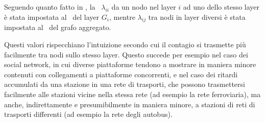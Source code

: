Seguendo quanto fatto in \cite{basaras:infspmul}, la \epprob\ $\lambda_{ii}$ da un nodo nel 
layer $i$ ad uno dello stesso layer è stata impostata al \crepp\ del layer $G_i$, 
mentre $\lambda_{ij}$ tra nodi in layer diversi è stata impostata al \crepp\ del grafo 
aggregato. 

Questi valori rispecchiano l'intuizione secondo cui il contagio si trasmette 
più facilmente tra nodi sullo stesso layer. Questo succede per esempio nel caso dei social 
network, in cui diverse piattaforme tendono a mostrare in maniera minore contenuti con
collegamenti a piattaforme concorrenti, e nel caso dei ritardi accumulati da 
una stazione in una rete di trasporti, che possono trasmettersi facilmente alle stazioni vicine 
nella stessa rete (ad esempio la rete ferroviaria), ma anche, indirettamente e presumibilmente in maniera
minore, a stazioni di reti di trasporti differenti (ad esempio la rete degli autobus).